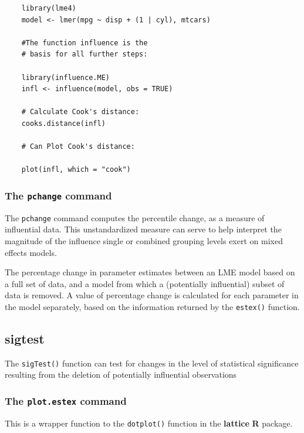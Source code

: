\documentclass[12pt, a4paper]{report}
\begin{document}
\begin{framed}
	\begin{verbatim}
	library(lme4)
	model <- lmer(mpg ~ disp + (1 | cyl), mtcars)
	
	#The function influence is the 
	# basis for all further steps:
	
	library(influence.ME)
	infl <- influence(model, obs = TRUE)
	
	# Calculate Cook's distance:
	cooks.distance(infl)
	
	# Can Plot Cook's distance:
	
	plot(infl, which = "cook")
	\end{verbatim}
\end{framed}




\subsubsection*{The \texttt{pchange} command}

The \texttt{pchange} command computes the percentile change, as a measure of influential data. This unstandardized measure can
serve to help interpret the magnitude of the influence single or combined grouping levels exert on
mixed effects models. 

The percentage change in parameter estimates between an LME model based on a full set of data, and a model from which a (potentially influential)
subset of data is removed. A value of percentage change is calculated for each parameter in the
model separately, based on the information returned by the \texttt{estex()} function.

\subsection*{sigtest}

The \texttt{sigTest()} function can test for changes in the level of statistical significance resulting from
the deletion of potentially influential observations


\subsubsection*{The \texttt{plot.estex} command}
This is a wrapper function to the \texttt{dotplot()} function in the \textbf{lattice} \textbf{R} package.
\end{document}
